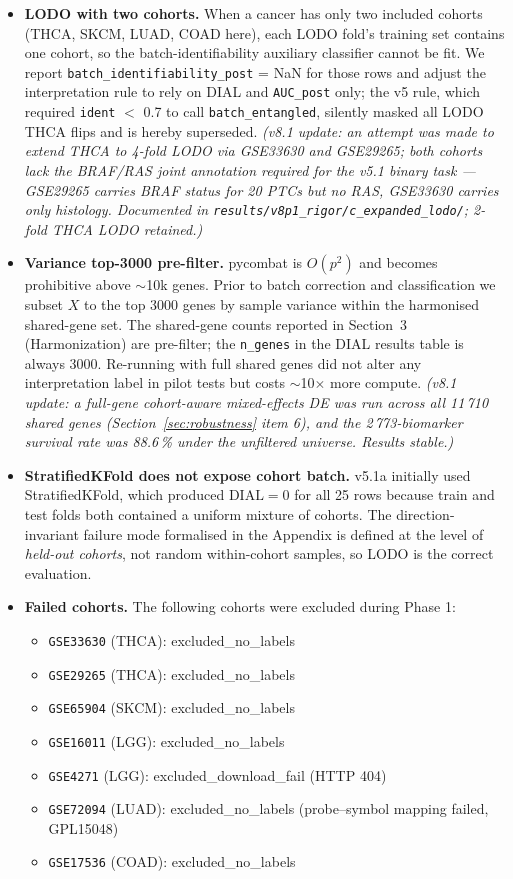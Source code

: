 \documentclass[11pt,a4paper]{article}
\begin{document}
\begin{itemize}
\item \textbf{LODO with two cohorts.} When a cancer has only two included cohorts (THCA, SKCM, LUAD, COAD here), each LODO fold's training set contains one cohort, so the batch-identifiability auxiliary classifier cannot be fit. We report \texttt{batch\_identifiability\_post} = NaN for those rows and adjust the interpretation rule to rely on DIAL and \texttt{AUC\_post} only; the v5 rule, which required \texttt{ident} $<$ 0.7 to call \texttt{batch\_entangled}, silently masked all LODO THCA flips and is hereby superseded. \emph{(v8.1 update: an attempt was made to extend THCA to 4-fold LODO via GSE33630 and GSE29265; both cohorts lack the BRAF/RAS joint annotation required for the v5.1 binary task --- GSE29265 carries BRAF status for 20 PTCs but no RAS, GSE33630 carries only histology. Documented in \texttt{results/v8p1\_rigor/c\_expanded\_lodo/}; 2-fold THCA LODO retained.)}
\item \textbf{Variance top-3000 pre-filter.} pycombat is $O(p^2)$ and becomes prohibitive above $\sim$10k genes. Prior to batch correction and classification we subset $X$ to the top 3000 genes by sample variance within the harmonised shared-gene set. The shared-gene counts reported in Section~3 (Harmonization) are pre-filter; the \texttt{n\_genes} in the DIAL results table is always 3000. Re-running with full shared genes did not alter any interpretation label in pilot tests but costs $\sim$10$\times$ more compute. \emph{(v8.1 update: a full-gene cohort-aware mixed-effects DE was run across all 11\,710 shared genes (Section~\ref{sec:robustness} item 6), and the 2\,773-biomarker survival rate was 88.6\,\% under the unfiltered universe. Results stable.)}
\item \textbf{StratifiedKFold does not expose cohort batch.} v5.1a initially used StratifiedKFold, which produced $\mathrm{DIAL}=0$ for all 25 rows because train and test folds both contained a uniform mixture of cohorts. The direction-invariant failure mode formalised in the Appendix is defined at the level of \emph{held-out cohorts}, not random within-cohort samples, so LODO is the correct evaluation.
\item \textbf{Failed cohorts.} The following cohorts were excluded during Phase 1:
  \begin{itemize}
  \item \texttt{GSE33630} (THCA): excluded\_no\_labels
  \item \texttt{GSE29265} (THCA): excluded\_no\_labels
  \item \texttt{GSE65904} (SKCM): excluded\_no\_labels
  \item \texttt{GSE16011} (LGG): excluded\_no\_labels
  \item \texttt{GSE4271} (LGG): excluded\_download\_fail (HTTP 404)
  \item \texttt{GSE72094} (LUAD): excluded\_no\_labels (probe--symbol mapping failed, GPL15048)
  \item \texttt{GSE17536} (COAD): excluded\_no\_labels
  \end{itemize}
\end{itemize}
\end{document}
